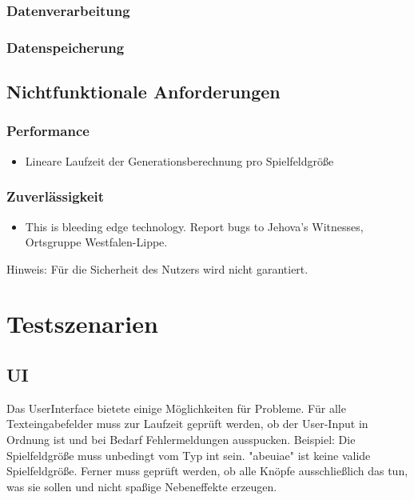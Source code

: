 \documentclass[11pt,a4paper]{article}
\begin{document}
    \pagebreak
    
\subsubsection{}



\subsubsection{Datenverarbeitung}
\subsubsection{Datenspeicherung}
\subsection{Nichtfunktionale Anforderungen}
\subsubsection{Performance}
\begin{itemize}
    \item Lineare Laufzeit der Generationsberechnung pro Spielfeldgröße
\end{itemize}
\subsubsection{Zuverlässigkeit}
\begin{itemize}
    \item This is bleeding edge technology. Report bugs to Jehova's Witnesses, Ortsgruppe Westfalen-Lippe.
\end{itemize}

Hinweis: Für die Sicherheit des Nutzers wird nicht garantiert.
\pagebreak
\section{Testszenarien}
\subsection{UI}
Das UserInterface bietete einige Möglichkeiten für Probleme. Für alle Texteingabefelder muss zur Laufzeit geprüft werden, ob der User-Input in Ordnung ist und bei Bedarf Fehlermeldungen ausspucken. Beispiel: Die Spielfeldgröße muss unbedingt vom Typ int sein. "abeuiae" ist keine valide Spielfeldgröße.
Ferner muss geprüft werden, ob alle Knöpfe ausschließlich das tun, was sie sollen und nicht spaßige Nebeneffekte erzeugen.
\end{document}
